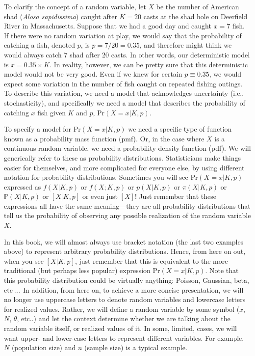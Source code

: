 To clarify the concept of a random variable, let $X$ be the number of
American shad (\emph{Alosa sapidissima}) caught after $K=20$ casts at
the shad hole on Deerfield River in Massachusetts. Suppose that
we had a good day and caught $x=7$ fish. If there were no random
variation at play, we would say that the probability of catching a
fish, denoted $p$, is $p=7/20=0.35$, and therefore might think we would always catch 7 shad after 20
casts. In other words, our deterministic model is $x =
0.35\times K$. In reality, however, we can be pretty sure that this
deterministic model would not be very good. Even if we knew for
certain $p \equiv 0.35$, we would expect some variation in the number
of fish caught on repeated fishing outings. To describe this
variation, we need a model that acknowledges uncertainty (i.e.,
stochasticity), and specifically we need a model that describes the
probability of catching $x$ fish given $K$ and $p$,
$\text{Pr}(X=x|K,p)$.

To specify a model for $\text{Pr}(X=x|K,p)$ we need a specific type of
function known as a probability mass function (pmf). Or, in the case
where $X$ is a continuous random variable, we need a probability
density function (pdf). We will generically refer to these as
probability distributions.
Statisticians make things easier for themselves,
and more complicated for everyone else, by using different notation
for probability distributions. Sometimes you will see
$\text{Pr}(X=x|K,p)$ expressed as $f(X|K,p)$ or $f(X; K,p)$ or
$p(X|K,p)$ or $\pi(X|K,p)$ or $\mathbb{P}(X|K,p)$ or $[X|K,p]$ or even
just $[X]$! Just remember that these expressions all have the same
meaning---they are all probability distributions that tell us the
probability of observing any possible realization of the random
variable $X$.

In this book, we will almost always use bracket notation (the last two
examples above) to represent arbitrary probability distributions.
Hence, from here on out, when you see $[X|K,p]$, just remember that
this is equivalent to the more traditional (but perhaps less popular)
expression $\text{Pr}(X=x|K,p)$. Note that this probability distribution
could be virtually anything: Poisson, Gaussian, beta, etc $\dots$
In addition,
from here on, to achieve a more concise presentation, we will no longer use uppercase letters to denote
random variables and lowercase letters for realized values. Rather, we
will define a random variable by some symbol ($x$, $N$, $\theta$,
etc..) and let the context determine whether we are talking about the
random variable itself, or realized values of it.
In some, limited, cases, we will want upper-
and lower-case letters to represent different variables. For example,
$N$ (population size)  and $n$ (sample size) is a typical example.

